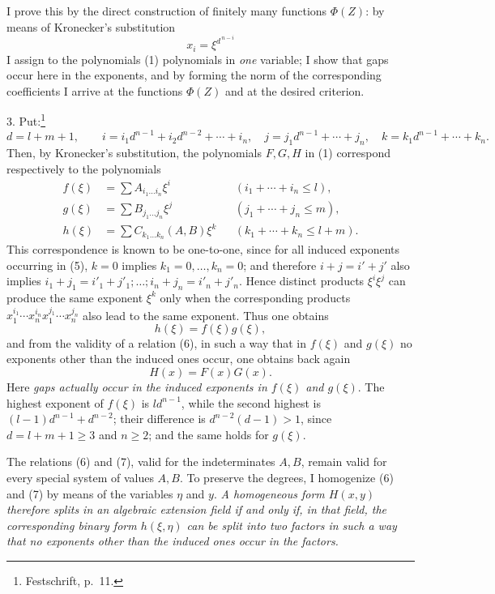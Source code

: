 I prove this by the direct construction of finitely many functions $\Phi(Z)$: by means of Kronecker's substitution
\[
 x_i=\xi^{d^{\,n-i}}
\]
I assign to the polynomials (1) polynomials in \emph{one} variable; I show that gaps occur here in the exponents, and by forming the norm of the corresponding coefficients I arrive at the functions $\Phi(Z)$ and at the desired criterion.

3. Put:\footnote{Festschrift, p.~11.}
\begin{equation}
 d=l+m+1,\qquad
 i=i_1d^{n-1}+i_2d^{n-2}+\cdots+i_n,
\quad
 j=j_1d^{n-1}+\cdots+j_n,
\quad
 k=k_1d^{n-1}+\cdots+k_n.
\tag{4}
\end{equation}
Then, by Kronecker's substitution, the polynomials $F,G,H$ in (1) correspond respectively to the polynomials
\begin{equation}
\begin{aligned}
 f(\xi)&=\sum A_{i_1\ldots i_n}\xi^i &&(i_1+\cdots+i_n\le l),\\
 g(\xi)&=\sum B_{j_1\ldots j_n}\xi^j &&(j_1+\cdots+j_n\le m),\\
 h(\xi)&=\sum C_{k_1\ldots k_n}(A,B)\xi^k &&(k_1+\cdots+k_n\le l+m).
\end{aligned}
\tag{5}
\end{equation}
This correspondence is known to be one-to-one, since for all induced exponents occurring in (5), $k=0$ implies $k_1=0,\ldots,k_n=0$; and therefore $i+j=i'+j'$ also implies $i_1+j_1=i'_1+j'_1;\ldots;i_n+j_n=i'_n+j'_n$. Hence distinct products $\xi^i\xi^j$ can produce the same exponent $\xi^k$ only when the corresponding products $x_1^{i_1}\cdots x_n^{i_n}x_1^{j_1}\cdots x_n^{j_n}$ also lead to the same exponent. Thus one obtains
\begin{equation}
 h(\xi)=f(\xi)g(\xi),
\tag{6}
\end{equation}
and from the validity of a relation (6), in such a way that in $f(\xi)$ and $g(\xi)$ no exponents other than the induced ones occur, one obtains back again
\begin{equation}
 H(x)=F(x)G(x).
\tag{7}
\end{equation}
Here \emph{gaps actually occur in the induced exponents in $f(\xi)$ and $g(\xi)$}. The highest exponent of $f(\xi)$ is $ld^{n-1}$, while the second highest is $(l-1)d^{n-1}+d^{n-2}$; their difference is $d^{n-2}(d-1)>1$, since $d=l+m+1\ge3$ and $n\ge2$; and the same holds for $g(\xi)$.

The relations (6) and (7), valid for the indeterminates $A,B$, remain valid for every special system of values $A,B$. To preserve the degrees, I homogenize (6) and (7) by means of the variables $\eta$ and $y$. \emph{A homogeneous form $H(x,y)$ therefore splits in an algebraic extension field if and only if, in that field, the corresponding binary form $h(\xi,\eta)$ can be split into two factors in such a way that no exponents other than the induced ones occur in the factors.}

